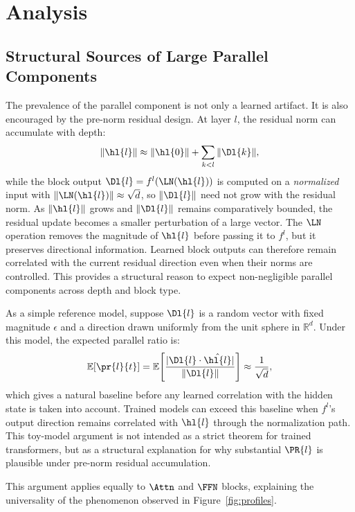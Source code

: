 \section{Analysis}
\label{sec:analysis}

\subsection{Structural Sources of Large Parallel Components}
\label{sec:why}

The prevalence of the parallel component is not only a learned artifact. It is
also encouraged by the pre-norm residual design. At layer $l$, the residual
norm can accumulate with depth:
\begin{equation}
  \|\hl{l}\| \approx \|\hl{0}\| + \sum_{k<l} \|\Dl{k}\|,
\end{equation}
while the block output $\Dl{l} = f^l(\LN(\hl{l}))$ is computed on a
\emph{normalized} input with $\|\LN(\hl{l})\| \approx \sqrt{d}$,
so $\|\Dl{l}\|$ need not grow with the residual norm. As $\|\hl{l}\|$ grows
and $\|\Dl{l}\|$ remains comparatively bounded, the residual update becomes a
smaller perturbation of a large vector. The $\LN$ operation removes the
magnitude of $\hl{l}$ before passing it to $f^l$, but it preserves directional
information. Learned block outputs can therefore remain correlated with the
current residual direction even when their norms are controlled. This provides
a structural reason to expect non-negligible parallel components across depth
and block type.

As a simple reference model, suppose $\Dl{l}$ is a random vector with fixed
magnitude $\epsilon$ and a direction drawn uniformly from the unit sphere in
$\mathbb{R}^d$. Under this model, the expected parallel ratio is:
\begin{equation}
  \mathbb{E}[\pr{l}{t}]
    = \mathbb{E}\!\left[\frac{|\Dl{l} \cdot \hat{\hl{l}}|}{\|\Dl{l}\|}\right]
    \approx \frac{1}{\sqrt{d}},
\end{equation}
\noindent
which gives a natural baseline before any learned correlation with the hidden
state is taken into account. Trained models can exceed this baseline when
$f^l$'s output direction remains correlated with $\hl{l}$ through the
normalization path. This toy-model argument is not intended as a strict theorem
for trained transformers, but as a structural explanation for why substantial
$\PR{l}$ is plausible under pre-norm residual accumulation.

This argument applies equally to $\Attn$ and $\FFN$ blocks, explaining the
universality of the phenomenon observed in Figure~\ref{fig:profiles}.

